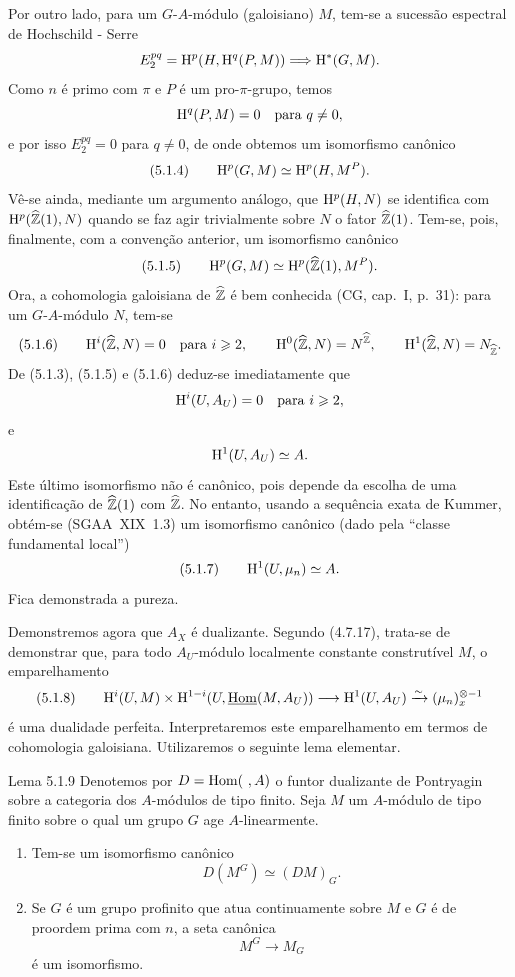\begin{prooftext}[Demonstração]
Por outro lado, para um $G$-$A$-módulo (galoisiano) $M$, tem-se a sucessão espectral de Hochschild - Serre
\[
E_2^{pq}=\mathrm{H}^p(H,\mathrm{H}^q(P,M))\Longrightarrow \mathrm{H}^{*}(G,M).
\]
Como $n$ é primo com $\pi$ e $P$ é um pro-$\pi$-grupo, temos
\[
\mathrm{H}^q(P,M)=0\quad\text{para }q\ne0,
\]
e por isso $E_2^{pq}=0$ para $q\ne0$, de onde obtemos um isomorfismo canônico
\[
(5.1.4)\qquad \mathrm{H}^p(G,M)\simeq \mathrm{H}^p(H,M^P).
\]
Vê-se ainda, mediante um argumento análogo, que $\mathrm{H}^p(H,N)$ se identifica com $\mathrm{H}^p(\widehat{\mathbb{Z}}(1),N)$ quando se faz agir trivialmente sobre $N$ o fator $\widehat{\mathbb{Z}}(1)$. Tem-se, pois, finalmente, com a convenção anterior, um isomorfismo canônico
\[
(5.1.5)\qquad \mathrm{H}^p(G,M)\simeq \mathrm{H}^p(\widehat{\mathbb{Z}}(1),M^P).
\]
Ora, a cohomologia galoisiana de $\widehat{\mathbb{Z}}$ é bem conhecida (CG, cap.~I, p.~31): para um $G$-$A$-módulo $N$, tem-se
\[
(5.1.6)\qquad
\mathrm{H}^i(\widehat{\mathbb{Z}},N)=0\quad\text{para }i\geqslant2,
\qquad
\mathrm{H}^0(\widehat{\mathbb{Z}},N)=N^{\widehat{\mathbb{Z}}},
\qquad
\mathrm{H}^1(\widehat{\mathbb{Z}},N)=N_{\widehat{\mathbb{Z}}}.
\]
De (5.1.3), (5.1.5) e (5.1.6) deduz-se imediatamente que
\[
\mathrm{H}^i(U,A_U)=0\quad\text{para }i\geqslant2,
\]
e
\[
\mathrm{H}^1(U,A_U)\simeq A.
\]
Este último isomorfismo não é canônico, pois depende da escolha de uma identificação de $\widehat{\mathbb{Z}}(1)$ com $\widehat{\mathbb{Z}}$. No entanto, usando a sequência exata de Kummer, obtém-se (SGAA~XIX~1.3) um isomorfismo canônico (dado pela \textquotedblleft classe fundamental local\textquotedblright{})
\[
(5.1.7)\qquad \mathrm{H}^1(U,\mu_n)\simeq A.
\]
Fica demonstrada a pureza.

Demonstremos agora que $A_X$ é dualizante. Segundo (4.7.17), trata-se de demonstrar que, para todo $A_U$-módulo localmente constante construtível $M$, o emparelhamento
\[
(5.1.8)\qquad \mathrm{H}^i(U,M)\times\mathrm{H}^{1-i}(U,\underline{\operatorname{Hom}}(M,A_U))\longrightarrow \mathrm{H}^1(U,A_U)\xrightarrow{\sim}(\mu_n)_x^{\otimes -1}
\]
é uma dualidade perfeita. Interpretaremos este emparelhamento em termos de cohomologia galoisiana. Utilizaremos o seguinte lema elementar.
\end{prooftext}

\begin{statement}{Lema 5.1.9}
Denotemos por $D=\operatorname{Hom}(\ ,A)$ o funtor dualizante de Pontryagin sobre a categoria dos $A$-módulos de tipo finito. Seja $M$ um $A$-módulo de tipo finito sobre o qual um grupo $G$ age $A$-linearmente.
\begin{enumerate}[label=(\roman*)]
\item Tem-se um isomorfismo canônico
\[
D(M^G)\simeq (DM)_G.
\]
\item Se $G$ é um grupo profinito que atua continuamente sobre $M$ e $G$ é de proordem prima com $n$, a seta canônica
\[
M^G\longrightarrow M_G
\]
é um isomorfismo.
\end{enumerate}
\end{statement}

